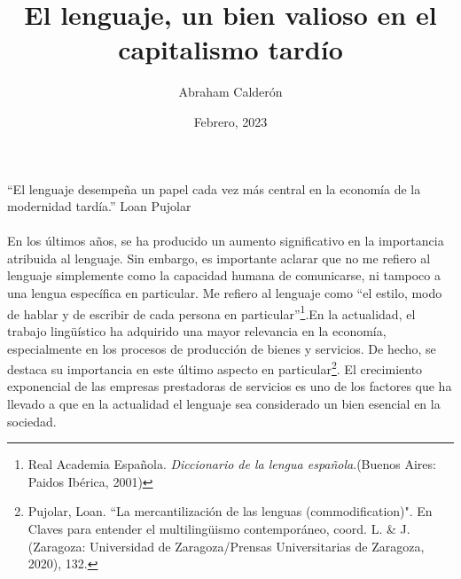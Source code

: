 \documentclass{article}
\title{El lenguaje, un bien valioso en el capitalismo tardío}
\author{Abraham Calderón}
\date{Febrero, 2023}
\begin{document}
    \maketitle
    \begin{multicols}{2}
    \paragraph{}
    \columnbreak
      
    \paragraph{}
    \begin{flushright}
        \columnbreak
        ``El lenguaje desempeña un papel cada vez más central en la economía de la modernidad tardía.''
        \linebreak
        Loan Pujolar
    \end{flushright}


    \end{multicols}

    \paragraph{}
    En los últimos años, se ha producido un aumento significativo en la importancia atribuida al lenguaje. Sin embargo, es importante aclarar que no me refiero al lenguaje simplemente como la capacidad humana de comunicarse, ni tampoco a una lengua específica en particular. Me refiero al lenguaje como “el estilo, modo de hablar y de escribir de cada persona en particular”\footnote{Real Academia Española.\emph{ Diccionario de la lengua española}.(Buenos Aires: Paidos Ibérica, 2001)}.En la actualidad, el trabajo lingüístico ha adquirido una mayor relevancia en la economía, especialmente en los procesos de producción de bienes y servicios. De hecho, se destaca su importancia en este último aspecto en particular\footnote{Pujolar, Loan. ``La mercantilización de las lenguas (commodification)". En Claves para entender el multilingüismo contemporáneo, coord. L. \& J. (Zaragoza: Universidad de Zaragoza/Prensas Universitarias de Zaragoza, 2020), 132.}. El crecimiento exponencial de las empresas prestadoras de servicios es uno de los factores que ha llevado a que en la actualidad el lenguaje sea considerado un bien esencial en la sociedad.
\end{document}
